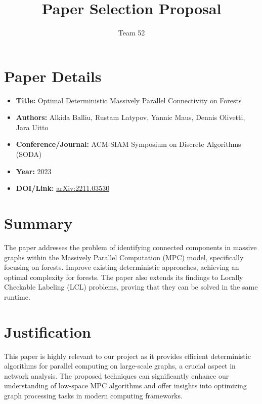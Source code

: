 \documentclass{article}
\begin{document}
\title{Paper Selection Proposal}
\date{}
\author{Team 52}
\maketitle

\section*{Paper Details}
\begin{itemize}
    \item \textbf{Title:} Optimal Deterministic Massively Parallel Connectivity on Forests  
    \item \textbf{Authors:} Alkida Balliu, Rustam Latypov, Yannic Maus, Dennis Olivetti, Jara Uitto  
    \item \textbf{Conference/Journal:} ACM-SIAM Symposium on Discrete Algorithms (SODA)  
    \item \textbf{Year:} 2023  
    \item \textbf{DOI/Link:} \href{https://doi.org/10.48550/arXiv.2211.03530}{arXiv:2211.03530}  
\end{itemize}

\section*{Summary}
The paper addresses the problem of identifying connected components in massive graphs within the Massively Parallel Computation (MPC) model, specifically focusing on forests. Improve existing deterministic approaches, achieving an optimal complexity for forests. The paper also extends its findings to Locally Checkable Labeling (LCL) problems, proving that they can be solved in the same runtime.

\section*{Justification}
This paper is highly relevant to our project as it provides efficient deterministic algorithms for parallel computing on large-scale graphs, a crucial aspect in network analysis. The proposed techniques can significantly enhance our understanding of low-space MPC algorithms and offer insights into optimizing graph processing tasks in modern computing frameworks.
\end{document}
